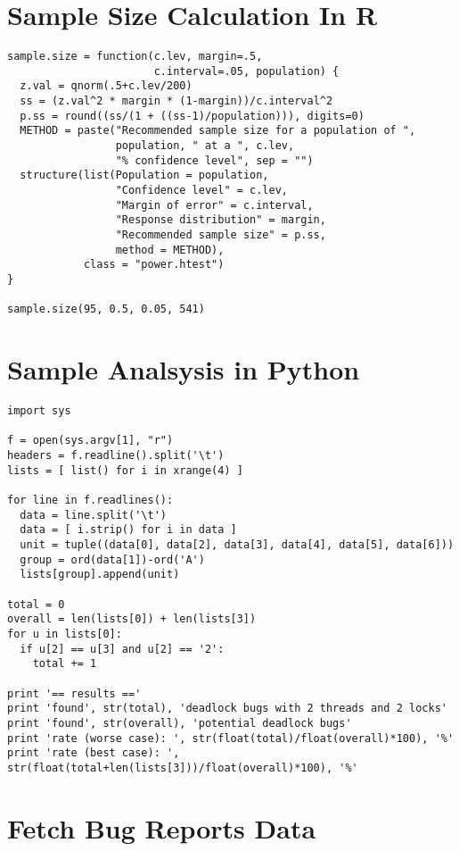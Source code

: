 \begin{appendices}

\chapter{Sample Size Calculation In R}

\noindent
\begin{verbatim}
sample.size = function(c.lev, margin=.5,
                       c.interval=.05, population) {
  z.val = qnorm(.5+c.lev/200)
  ss = (z.val^2 * margin * (1-margin))/c.interval^2
  p.ss = round((ss/(1 + ((ss-1)/population))), digits=0)
  METHOD = paste("Recommended sample size for a population of ",
                 population, " at a ", c.lev,
                 "% confidence level", sep = "")
  structure(list(Population = population,
                 "Confidence level" = c.lev,
                 "Margin of error" = c.interval,
                 "Response distribution" = margin,
                 "Recommended sample size" = p.ss,
                 method = METHOD),
            class = "power.htest")
}

sample.size(95, 0.5, 0.05, 541)
\end{verbatim}

\chapter{Sample Analsysis in Python}

\noindent
\begin{verbatim}
import sys

f = open(sys.argv[1], "r")
headers = f.readline().split('\t')
lists = [ list() for i in xrange(4) ]

for line in f.readlines():
  data = line.split('\t')
  data = [ i.strip() for i in data ]
  unit = tuple((data[0], data[2], data[3], data[4], data[5], data[6]))
  group = ord(data[1])-ord('A')
  lists[group].append(unit)

total = 0
overall = len(lists[0]) + len(lists[3])
for u in lists[0]:
  if u[2] == u[3] and u[2] == '2':
    total += 1

print '== results =='
print 'found', str(total), 'deadlock bugs with 2 threads and 2 locks'
print 'found', str(overall), 'potential deadlock bugs'
print 'rate (worse case): ', str(float(total)/float(overall)*100), '%'
print 'rate (best case): ', str(float(total+len(lists[3]))/float(overall)*100), '%'
\end{verbatim}


\chapter{Fetch Bug Reports Data}


\end{appendices}
